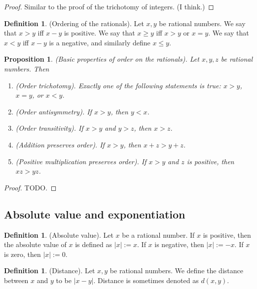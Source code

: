\documentclass[12pt]{article}
\newtheorem{proposition}[theorem]{Proposition}
\theoremstyle{definition}
\newtheorem{definition}[theorem]{Definition}
\theoremstyle{remark}
\begin{document}
\begin{proof}
    Similar to the proof of the trichotomy of integers. (I think.)
\end{proof}

\begin{definition}
    (Ordering of the rationals). Let $x, y$ be rational numbers. We say that $x > y$ iff $x - y$ is positive. We say that $x \geq y$ iff $x > y$ or $x = y$. We say that $x < y$ iff $x - y$ is a negative, and similarly define $x \leq y$.
\end{definition}

\begin{proposition}
    (Basic properties of order on the rationals). Let $x, y, z$ be rational numbers. Then
    \begin{enumerate}
        \item (Order trichotomy). Exactly one of the following statements is true: $x > y$, $x = y$, or $x < y$.
        \item (Order antisymmetry). If $x > y$, then $y < x$.
        \item (Order transitivity). If $x > y$ and $y > z$, then $x > z$.
        \item (Addition preserves order). If $x > y$, then $x + z > y + z$.
        \item (Positive multiplication preserves order). If $x > y$ and $z$ is positive, then $xz > yz$.
    \end{enumerate}
\end{proposition}

\begin{proof}
    TODO.
\end{proof}

\subsection{Absolute value and exponentiation}

\begin{definition}
    (Absolute value). Let $x$ be a rational number. If $x$ is positive, then the absolute value of $x$ is defined as $|x| := x$. If $x$ is negative, then $|x| := -x$. If $x$ is zero, then $|x| := 0$.
\end{definition}

\begin{definition}
    (Distance). Let $x, y$ be rational numbers. We define the distance between $x$ and $y$ to be $|x-y|$. Distance is sometimes denoted as $d(x,y)$.
\end{definition}
\end{document}
